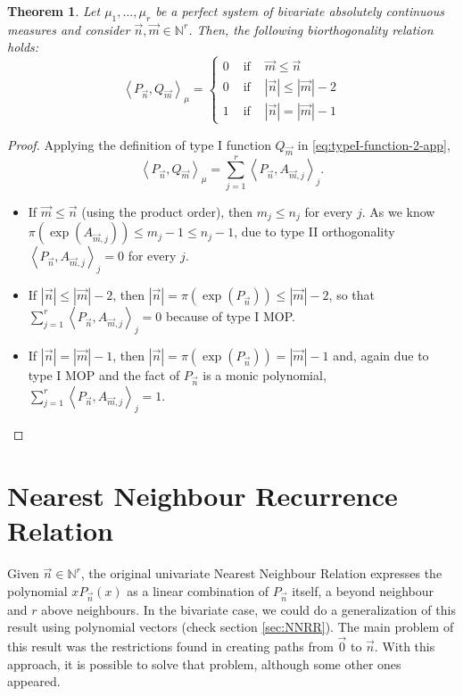 \documentclass[12pt,a4]{report}
\theoremstyle{plain}
\newtheorem{theorem}{Theorem}[section]
\newcommand{\N}[0]{\mathbb{N}}
\newcommand{\prodesc}[2]{\left\langle #1 , #2 \right\rangle}
\begin{document}
    \begin{theorem}
        \label{th:biorthogonality-2-app}
        Let $\mu_1,\dots,\mu_r$ be a perfect system of bivariate absolutely continuous measures and consider $\vec n,\vec m\in\N^r$. Then, the following biorthogonality relation holds:
        \begin{equation}
            \label{eq:biorthogonality-2-app}
            \prodesc{P_{\vec n}}{Q_{\vec m}}_{\mu} = \left\{\begin{array}{ccc}
                0 & \text{ if } & \vec m \leq \vec n \\
                0 & \text{ if } & |\vec n| \leq |\vec m|-2 \\
                1 & \text{ if } & |\vec n| = |\vec m|-1 
            \end{array}\right.
        \end{equation}
    \end{theorem}
    \begin{proof}
        Applying the definition of type I function $Q_{\vec m}$ in \eqref{eq:typeI-function-2-app}, $$\prodesc{P_{\vec n}}{Q_{\vec m}}_{\mu} =\displaystyle\sum_{j=1}^r \prodesc{P_{\vec n}}{A_{\vec m,j}}_j.$$
        \begin{itemize}
            \item If $\vec m \leq \vec n$ (using the product order), then $m_j\leq n_j$ for every $j$. As we know $\pi(\exp(A_{\vec m,j}))\leq m_j-1 \leq n_j -1$, due to type II orthogonality $\prodesc{P_{\vec n}}{A_{\vec m,j}}_j=0$ for every $j$.
            \item If $|\vec n|\leq|\vec m|-2$, then $|\vec n|=\pi(\exp(P_{\vec n}))\leq|\vec m|-2$, so that $\displaystyle\sum_{j=1}^r\prodesc{P_{\vec n}}{A_{\vec m,j}}_j = 0$ because of type I MOP.
            \item If $|\vec n|=|\vec m|-1$, then  $|\vec n|=\pi(\exp(P_{\vec n}))=|\vec m|-1$ and, again due to type I MOP and the fact of $P_{\vec n}$ is a monic polynomial, $\displaystyle\sum_{j=1}^r\prodesc{P_{\vec n}}{A_{\vec m,j}}_j = 1$.
        \end{itemize}
    \end{proof}

    \section{Nearest Neighbour Recurrence Relation}

    Given $\vec n\in\N^r$, the original univariate Nearest Neighbour Relation \cite[Theorem 23.1.7]{Ismail} expresses the polynomial $xP_{\vec n}(x)$ as a linear combination of $P_{\vec n}$ itself, a beyond neighbour and $r$ above neighbours. In the bivariate case, we could do a generalization of this result using polynomial vectors (check section \ref{sec:NNRR}). The main problem of this result was the restrictions found in creating paths from $\vec 0$ to $\vec n$. With this approach, it is possible to solve that problem, although some other ones appeared.
    
\end{document}
